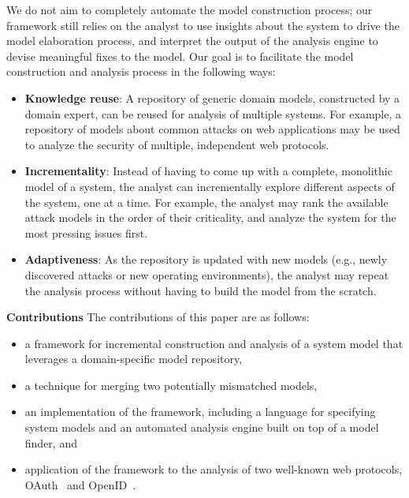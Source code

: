 We do not aim to completely automate the model construction process;
our framework still relies on the analyst to use insights about the
system to drive the model elaboration process, and interpret the
output of the analysis engine to devise meaningful fixes to the
model. Our goal is to facilitate the model construction and analysis
process in the following ways:
\begin{itemize}
\item \textbf{Knowledge reuse}: A repository of generic domain models,
  constructed by a domain expert, can be reused for analysis of
  multiple systems. For example, a repository of models about common
  attacks on web applications may be used to analyze the security of
  multiple, independent web protocols.
\item \textbf{Incrementality}: Instead of having to come up with a
  complete, monolithic model of a system, the analyst can
  incrementally explore different aspects of the system, one at a
  time. For example, the analyst may rank the available attack models
  in the order of their criticality, and analyze the system for the
  most pressing issues first.
\item \textbf{Adaptiveness}: As the repository is updated with new
  models (e.g., newly discovered attacks or new operating environments),
  the analyst may repeat the analysis process without having to build
  the model from the scratch.
\end{itemize}

\textbf{Contributions} The contributions of this paper are as
follows:
\begin{itemize}
\item a framework for incremental construction and analysis of a
  system model that leverages a domain-specific model repository,
\item a technique for merging two potentially mismatched models,
\item an implementation of the framework, including a language for
  specifying system models and an automated analysis engine built on
  top of a model finder, and
\item application of the framework to the analysis of two well-known
  web protocols, OAuth~\cite{oauth} and OpenID~\cite{openid}.
\end{itemize}

